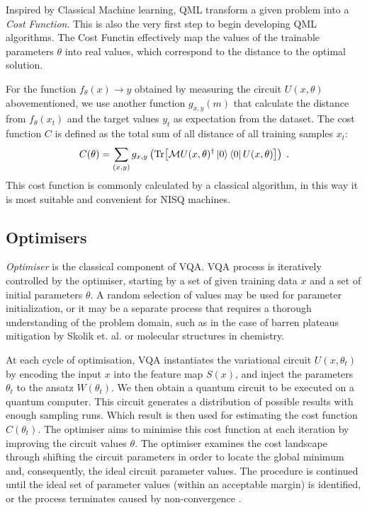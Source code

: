 Inspired by Classical Machine learning, QML transform a given problem into a \emph{Cost Function}.
This is also the very first step to begin developing QML algorithms.
The Cost Functin effectively map the values of the trainable parameters $\theta$ into real values, which correspond to the distance to the optimal solution.

For the function ${f_\theta(x) \rightarrow y}$ obtained by measuring the circuit $U(x, \theta)$ abovementioned, we use another function $g_{x,y}(m)$ that calculate the distance from $f_\theta(x_t)$ and the target values $y_t$ as expectation from the dataset.
The cost function $C$ is defined as the total sum of all distance of all training samples $x_t$:
\begin{equation}
    C(\theta) = \sum_{(x,y)} g_{x,y} \left(\Tr[ \mathcal{M} U(x, \theta)^\dagger \left\vert{0}\right\rangle \left\langle{0}\right\vert U(x, \theta) ]\right) \;.
    \label{Eqn: Cost function}
\end{equation}
This cost function is commonly calculated by a classical algorithm, in this way it is most suitable and convenient for NISQ machines.

\subsection{Optimisers} \label{Sec: Optimiser}

\emph{Optimiser} is the classical component of VQA.
VQA process is iteratively controlled by the optimiser, starting by a set of given training data $x$ and a set of initial parameters $\theta$.
A random selection of values may be used for parameter initialization, or it may be a separate process that requires a thorough understanding of the problem domain,
such as in the case of barren plateaus mitigation by Skolik et. al. \cite{skolikLayerwiseLearningQuantum2021a} or molecular structures in chemistry.

At each cycle of optimisation, VQA instantiates the variational circuit $U(x, \theta_t)$ by encoding the input $x$ into the feature map $S(x)$, and inject the parameters $\theta_t$ to the ansatz $W(\theta_t)$.
We then obtain a quantum circuit to be executed on a quantum computer.
This circuit generates a distribution of possible results with enough sampling runs.
Which result is then used for estimating the cost function $C(\theta_t)$.
The optimiser aims to minimise this cost function at each iteration by improving the circuit values $\theta$.
The optimiser examines the cost landscape through shifting the circuit parameters in order to locate the global minimum and, consequently, the ideal circuit parameter values.
The procedure is continued until the ideal set of parameter values (within an acceptable margin) is identified, or the process terminates caused by non-convergence \cite{cerezoVariationalQuantumAlgorithms2021}.

